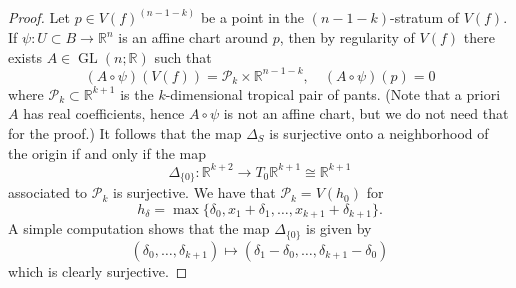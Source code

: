\documentclass[10pt,a4paper]{amsart}
\DeclareMathOperator{\GL}{GL}
\def\R{\mathbb{R}}
\def\x{\times}
\begin{document}
\begin{proof}
    Let $p \in V(f)^{(n-1-k)}$ be a point in the $(n-1-k)$-stratum of $V(f)$.
    If $\psi: U \subset B \to \R^n$ is an affine chart around $p$, then by regularity of $V(f)$ there exists $A \in \GL(n;\R)$ such that
    $$
    (A \circ \psi)(V(f)) = \mathcal P_{k} \x \R^{n-1-k},\quad (A\circ\psi)(p)=0
    $$
    where $\mathcal P_{k} \subset \R^{k+1}$ is the $k$-dimensional tropical pair of pants.
    (Note that a priori $A$ has real coefficients, hence $A \circ \psi$ is not an affine chart, but we do not need that for the proof.)
    It follows that the map $\Delta_S$ is surjective onto a neighborhood of the origin if and only if the map 
    $$
        \Delta_{\{0\}}: \R^{k+2} \to T_0 \R^{k+1} \cong \R^{k+1}
    $$
    associated to $\mathcal P_{k}$ is surjective. 
    We have that $\mathcal P_{k} = V(h_0)$ for
    $$
        h_\delta = \max\{\delta_0,x_1+\delta_1,\dots,x_{k+1}+\delta_{k+1}\}.
    $$
    A simple computation shows that the map $\Delta_{\{0\}}$ is given by
    $$
        (\delta_0,\dots,\delta_{k+1}) \mapsto (\delta_1-\delta_0,\dots,\delta_{k+1}-\delta_0)
    $$
    which is clearly surjective.
\end{proof}
\end{document}
